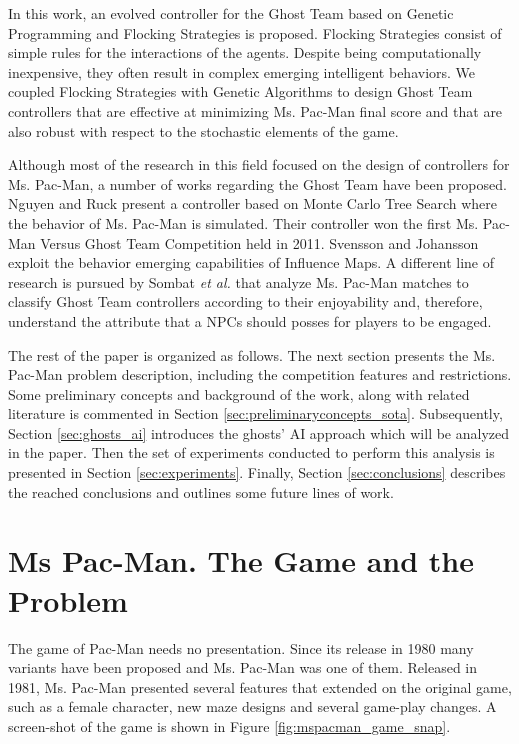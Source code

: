\documentclass{llncs}
\begin{document}
In this work, an evolved controller for the Ghost Team based on Genetic Programming and Flocking Strategies is proposed. Flocking Strategies consist of simple rules for the interactions of the agents. Despite being computationally inexpensive, they often result in complex emerging intelligent behaviors. We coupled Flocking Strategies with Genetic Algorithms to design Ghost Team controllers that are effective at minimizing Ms. Pac-Man final score and that are also robust with respect to the stochastic elements of the game.

Although most of the research in this field focused on the design of controllers for Ms. Pac-Man, a number of works regarding the Ghost Team have been proposed. Nguyen and Ruck \cite{Nguyen2011,Nguyen2013} present a controller based on Monte Carlo Tree Search where the behavior of Ms. Pac-Man is simulated. Their controller won the first Ms. Pac-Man Versus Ghost Team Competition held in 2011. Svensson and Johansson \cite{Svensson2012} exploit the behavior emerging capabilities of Influence Maps. A different line of research is pursued by Sombat \textit{et al.} \cite{Sombat2012} that analyze Ms. Pac-Man matches to classify Ghost Team controllers according to their enjoyability and, therefore, understand the attribute that a NPCs should posses for players to be engaged.

The rest of the paper is organized as follows. The next section presents the Ms. Pac-Man problem description, including the competition features and restrictions. Some preliminary concepts and background of the work, along with related literature is commented in Section \ref{sec:preliminaryconcepts_sota}. Subsequently, Section \ref{sec:ghosts_ai} introduces the ghosts' AI approach which will be analyzed in the paper. Then the set of experiments conducted to perform this analysis is presented in Section \ref{sec:experiments}. Finally, Section \ref{sec:conclusions} describes the reached conclusions and outlines some future lines of work.

%
%

\section{Ms Pac-Man. The Game and the Problem}
\label{sec:mspacman_problem}

The game of Pac-Man needs no presentation. Since its release in 1980 many variants have been proposed and Ms. Pac-Man was one of them. Released in 1981, Ms. Pac-Man presented several features that extended on the original game, such as a female character, new maze designs and several game-play changes. A screen-shot of the game is shown in Figure \ref{fig:mspacman_game_snap}.
\end{document}
